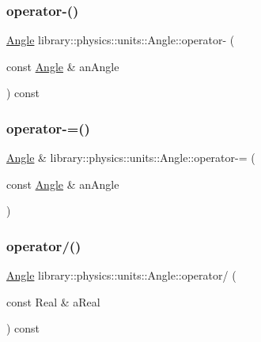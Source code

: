 \mbox{\label{classlibrary_1_1physics_1_1units_1_1_angle_a034a88587139bb8642e80f353ead5ce2}} 
\subsubsection{\texorpdfstring{operator-\/()}{operator-()}}
{\footnotesize\ttfamily \hyperlink{classlibrary_1_1physics_1_1units_1_1_angle}{Angle} library\+::physics\+::units\+::\+Angle\+::operator-\/ (\begin{DoxyParamCaption}\item[{const \hyperlink{classlibrary_1_1physics_1_1units_1_1_angle}{Angle} \&}]{an\+Angle }\end{DoxyParamCaption}) const}

\mbox{\label{classlibrary_1_1physics_1_1units_1_1_angle_a2278161c893f91578913951c62f29c39}} 
\subsubsection{\texorpdfstring{operator-\/=()}{operator-=()}}
{\footnotesize\ttfamily \hyperlink{classlibrary_1_1physics_1_1units_1_1_angle}{Angle} \& library\+::physics\+::units\+::\+Angle\+::operator-\/= (\begin{DoxyParamCaption}\item[{const \hyperlink{classlibrary_1_1physics_1_1units_1_1_angle}{Angle} \&}]{an\+Angle }\end{DoxyParamCaption})}

\mbox{\label{classlibrary_1_1physics_1_1units_1_1_angle_a4807751951c97b1de78e7b98b51abaed}} 
\subsubsection{\texorpdfstring{operator/()}{operator/()}}
{\footnotesize\ttfamily \hyperlink{classlibrary_1_1physics_1_1units_1_1_angle}{Angle} library\+::physics\+::units\+::\+Angle\+::operator/ (\begin{DoxyParamCaption}\item[{const Real \&}]{a\+Real }\end{DoxyParamCaption}) const}

